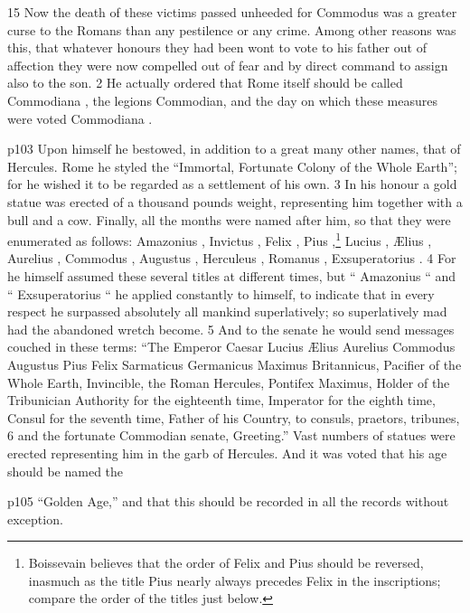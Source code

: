 15
Now the death of these victims passed unheeded for Commodus was a greater curse to the Romans than any pestilence or any crime. Among other reasons was this, that whatever honours they had been wont to vote to his father out of affection they were now compelled out of fear and by direct command to assign also to the son. 2 He actually ordered that Rome itself should be called Commodiana , the legions Commodian, and the day on which these measures were voted Commodiana .

p103 Upon himself he bestowed, in addition to a great many other names, that of Hercules. Rome he styled the ``Immortal, Fortunate Colony of the Whole Earth''; for he wished it to be regarded as a settlement of his own. 3 In his honour a gold statue was erected of a thousand pounds weight, representing him together with a bull and a cow. Finally, all the months were named after him, so that they were enumerated as follows: Amazonius , Invictus , Felix , Pius ,\texthebrew{⁠}\footnote{Boissevain believes that the order of Felix and Pius should be reversed, inasmuch as the title Pius nearly always precedes Felix in the inscriptions; compare the order of the titles just below.

} Lucius , Ælius , Aurelius , Commodus , Augustus , Herculeus , Romanus , Exsuperatorius . 4 For he himself assumed these several titles at different times, but `` Amazonius `` and `` Exsuperatorius `` he applied constantly to himself, to indicate that in every respect he surpassed absolutely all mankind superlatively; so superlatively mad had the abandoned wretch become. 5 And to the senate he would send messages couched in these terms: ``The Emperor Caesar Lucius Ælius Aurelius Commodus Augustus Pius Felix Sarmaticus Germanicus Maximus Britannicus, Pacifier of the Whole Earth, Invincible, the Roman Hercules, Pontifex Maximus, Holder of the Tribunician Authority for the eighteenth time, Imperator for the eighth time, Consul for the seventh time, Father of his Country, to consuls, praetors, tribunes, 6 and the fortunate Commodian senate, Greeting.'' Vast numbers of statues were erected representing him in the garb of Hercules. And it was voted that his age should be named the

p105 ``Golden Age,'' and that this should be recorded in all the records without exception.

